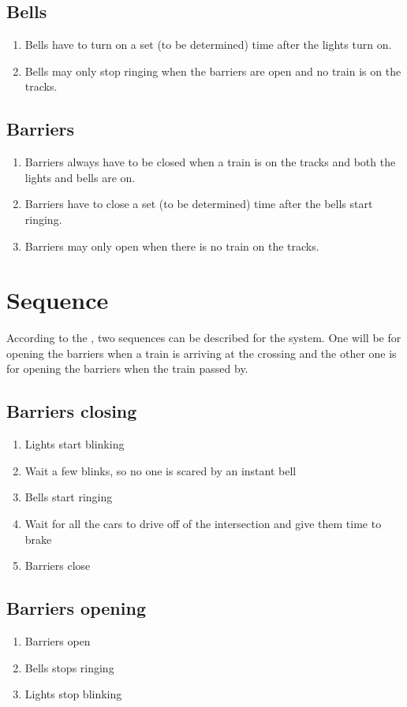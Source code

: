 \documentclass[final]{report}
\begin{document}
\subsection{Bells}
	\begin{enumerate}
		\item Bells have to turn on a set (to be determined) time after the lights turn on.
		\item Bells may only stop ringing when the barriers are open and no train is on the tracks.
	\end{enumerate}

\subsection{Barriers}
	\begin{enumerate}
		\item Barriers always have to be closed when a train is on the tracks and both the lights and bells are on.
		\item Barriers have to close a set (to be determined) time after the bells start ringing.
		\item Barriers may only open when there is no train on the tracks.
	\end{enumerate}


\section{Sequence}
According to the , two sequences can be described for the system.
One will be for opening the barriers when a train is arriving at the crossing and the other one is for opening the barriers when the train passed by.

\subsection{Barriers closing}
\begin{enumerate}
\item Lights start blinking
\item Wait a few blinks, so no one is scared by an instant bell
\item Bells start ringing
\item Wait for all the cars to drive off of the intersection and give them time to brake
\item Barriers close
\end{enumerate}

\subsection{Barriers opening}
\begin{enumerate}
\item Barriers open
\item Bells stops ringing
\item Lights stop blinking
\end{enumerate}
\end{document}
